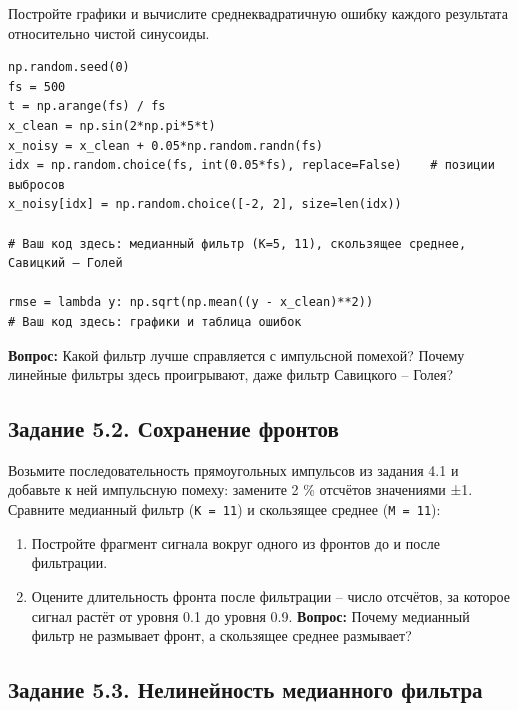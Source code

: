 \documentclass[12pt,a4paper,openany]{book}
\providecommand{\tightlist}{\setlength{\itemsep}{0pt}\setlength{\parskip}{0pt}}
\begin{document}
Постройте графики и вычислите среднеквадратичную ошибку каждого результата относительно чистой синусоиды.

\begin{Verbatim}[fontsize=\small, breaklines, breakanywhere, frame=single, framesep=2mm]
np.random.seed(0)
fs = 500
t = np.arange(fs) / fs
x_clean = np.sin(2*np.pi*5*t)
x_noisy = x_clean + 0.05*np.random.randn(fs)
idx = np.random.choice(fs, int(0.05*fs), replace=False)    # позиции выбросов
x_noisy[idx] = np.random.choice([-2, 2], size=len(idx))

# Ваш код здесь: медианный фильтр (K=5, 11), скользящее среднее, Савицкий – Голей

rmse = lambda y: np.sqrt(np.mean((y - x_clean)**2))
# Ваш код здесь: графики и таблица ошибок
\end{Verbatim}

\textbf{Вопрос:} Какой фильтр лучше справляется с импульсной помехой? Почему линейные фильтры здесь проигрывают, даже фильтр Савицкого -- Голея?

\subsection*{Задание 5.2. Сохранение фронтов}

Возьмите последовательность прямоугольных импульсов из задания 4.1 и добавьте к ней импульсную помеху: замените 2 \% отсчётов значениями ±1. Сравните медианный фильтр (\texttt{K\ =\allowbreak{}\ 11}) и скользящее среднее (\texttt{M\ =\allowbreak{}\ 11}):

\begin{enumerate}
\def\labelenumi{\arabic{enumi}.}
\tightlist
\item
  Постройте фрагмент сигнала вокруг одного из фронтов до и после фильтрации.
\item
  Оцените длительность фронта после фильтрации -- число отсчётов, за которое сигнал растёт от уровня 0.1 до уровня 0.9.
  \textbf{Вопрос:} Почему медианный фильтр не размывает фронт, а скользящее среднее размывает?
\end{enumerate}

\subsection*{Задание 5.3. Нелинейность медианного фильтра}
\end{document}
